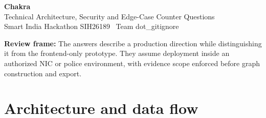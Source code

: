 \documentclass[10pt,a4paper]{article}
\newcommand{\note}[1]{\vspace{4pt}\noindent\colorbox{paper}{\parbox{\dimexpr\linewidth-2\fboxsep}{\small\textbf{Review frame:} #1}}\vspace{6pt}}
\begin{document}
\begin{center}
{\Huge\bfseries\color{navy}Chakra}\\[3pt]
{\Large Technical Architecture, Security and Edge-Case Counter Questions}\\[5pt]
{\normalsize Smart India Hackathon SIH26189 \textbar\ Team dot\_gitignore}
\end{center}
\note{The answers describe a production direction while distinguishing it from the frontend-only prototype. They assume deployment inside an authorized NIC or police environment, with evidence scope enforced before graph construction and export.}

\section{Architecture and data flow}
\end{document}
